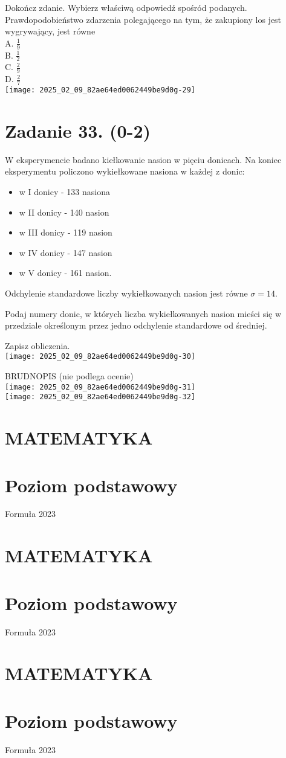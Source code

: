\documentclass[10pt]{article}
\begin{document}
Dokończ zdanie. Wybierz właściwą odpowiedź spośród podanych.\\
Prawdopodobieństwo zdarzenia polegającego na tym, że zakupiony los jest wygrywający, jest równe\\
A. \(\frac{1}{9}\)\\
B. \(\frac{1}{2}\)\\
C. \(\frac{2}{9}\)\\
D. \(\frac{2}{7}\)\\
\texttt{[image: 2025\_02\_09\_82ae64ed0062449be9d0g-29]}

\section*{Zadanie 33. (0-2)}
W eksperymencie badano kiełkowanie nasion w pięciu donicach. Na koniec eksperymentu policzono wykiełkowane nasiona w każdej z donic:

\begin{itemize}
  \item w I donicy - 133 nasiona
  \item w II donicy - 140 nasion
  \item w III donicy - 119 nasion
  \item w IV donicy - 147 nasion
  \item w V donicy - 161 nasion.
\end{itemize}

Odchylenie standardowe liczby wykiełkowanych nasion jest równe \(\sigma=14\).

Podaj numery donic, w których liczba wykiełkowanych nasion mieści się w przedziale określonym przez jedno odchylenie standardowe od średniej.

Zapisz obliczenia.\\
\texttt{[image: 2025\_02\_09\_82ae64ed0062449be9d0g-30]}

BRUDNOPIS (nie podlega ocenie)\\
\texttt{[image: 2025\_02\_09\_82ae64ed0062449be9d0g-31]}\\
\texttt{[image: 2025\_02\_09\_82ae64ed0062449be9d0g-32]}

\section*{MATEMATYKA}
\section*{Poziom podstawowy}
Formuła 2023

\section*{MATEMATYKA}
\section*{Poziom podstawowy}
Formuła 2023

\section*{MATEMATYKA}
\section*{Poziom podstawowy}
Formuła 2023
\end{document}
